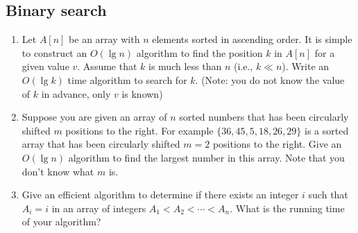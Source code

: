 \subsection{Binary search}
\begin{Exercise}
\begin{enumerate}
\item Let $A[n]$ be an array with $n$ elements sorted in ascending order. It is simple to construct an $O(\lg n)$ algorithm to find the position $k$ in $A[n]$ for a given value $v$. Assume that $k$ is much less than $n$ (i.e., $k \ll n$). Write an $O(\lg k)$ time algorithm to search for $k$.
(Note: you do not know the value of $k$ in advance, only $v$ is known) \label{sequence:exponential-search}
\item Suppose you are given an array of $n$ sorted numbers that has been circularly shifted $m$ positions to the right. For example $\{36, 45, 5, 18, 26, 29\}$ is a sorted array that has been circularly shifted $m = 2$ positions to the right. Give an $O(\lg n)$ algorithm to find the largest number in this array. Note that you don't know what $m$ is. \label{sequence:shift}
\item Give an efficient algorithm to determine if there exists an integer $i$ such that $A_i = i$ in an array of integers $A_1 < A_2 < \cdots < A_n$. What is the running time of your algorithm? \label{sequence:fixed-point}
\end{enumerate}
\end{Exercise}
